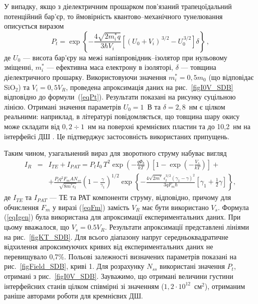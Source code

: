 У випадку, якщо з діелектричним прошарком пов'язаний трапецоїдальний потенційний бар'єр,
то ймовірність квантово--механічного тунелювання описується виразом
\begin{equation}\label{eqPt}
    P_t=\exp\left\{-\frac{4\sqrt{2m_i^*q}}{3\hbar V_i}\left[(U_0+V_i)^{\,3/2}-U_0^{\,3/2}\right]\delta\right\}\,,
\end{equation}
де
$U_0$ --- висота бар'єру на межі напівпровідник--ізолятор при нульовому зміщенні,
$m_i^*$ --- ефективна маса електрону в ізоляторі,
$\delta$ --- товщина діелектричного прошарку.
Використовуючи значення $m_i^*=0,5m_0$ (що відповідає SiO$_2$)
та $V_i=0,5V_R$, проведена апроксимація даних на рис.~\ref{figI0V_SDB} відповідно до формули~(\ref{eqPt}).
Результати показані на рисунку суцільною лінією.
Отримані значення параметрів $U_0=1$~В та $\delta=2,8$~нм є цілком реальними: наприклад,
в літературі повідомляється, що товщина шару окису може складати від $0,2\div1$~нм на поверхні кремнієвих пластин \cite{Saito} та
до 10,2~нм на інтерфейсі ДШ \cite{SHIWAKOTI2018}.
Це підтверджує застосовність використаних припущень.

Таким чином, узагальнений вираз для зворотного струму набуває вигляд
\begin{eqnarray}
\label{eqIgen}
 I_R&=&I_{TE}+I_{P\!AT}=P_tI_0\,T^2\exp\left(-\frac{q\Phi_b}{kT}\right)\left[1-\exp\left(-\frac{V_s}{kT}\right)\right]+\\
 &&+\frac{P_tq^2F_mAN_{ss}}{\sqrt{8m^*\epsilon_t}}\left(1-\frac{\gamma}{\gamma_1}\right)^{1/2}\exp
    \left\{-\frac{4\sqrt{2m^*}\,\epsilon_t^{3/2}\left(\gamma_1-\gamma\right)^2}{3qF_m\hbar}
    [\gamma_1+\frac{1}{2}\gamma]\right\}\nonumber,
\end{eqnarray}
де
$I_{TE}$ та $I_{P\!AT}$ --- ТЕ та РАТ компоненти струму, відповідно,
причому для обчислення $F_m$ у виразі (\ref{eqFm}) замість $V_R$ має бути використано $V_s$.
Формула (\ref{eqIgen}) була використана для апроксимації експериментальних даних.
При цьому вважалося, що $V_s=0.5V_R$.
Результати апроксимації представлені лініями на рис.~\ref{figKT_SDB}.
Для всього діапазону напруг середньоквадратичне відхилення апроксимуючих кривих від експериментальних даних не перевищувало 0,7\%.
Польові залежності визначених параметрів показані на рис.~\ref{figField_SDB}, криві 1.
Для розрахунку $N_{ss}$ використані значення $P_t$, отримані з рис.~\ref{figI0V_SDB}.
Зауважимо, що отримані величини густини інтерфейсних станів цілком співмірні зі значенням ($1,2\cdot10^{12}$~см$^{2}$),
отриманим раніше авторами роботи \cite{PipinsFTP} для кремнієвих ДШ.


